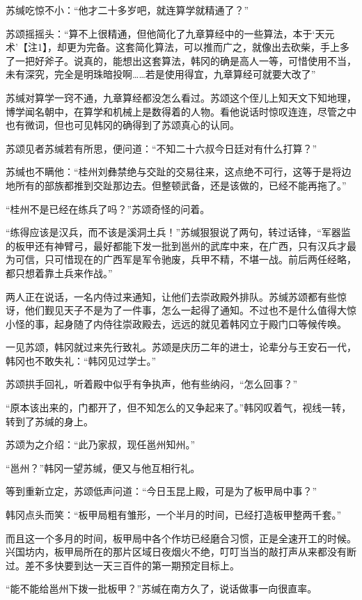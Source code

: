 苏缄吃惊不小：“他才二十多岁吧，就连算学就精通了？”

苏颂摇摇头：“算不上很精通，但他简化了九章算经中的一些算法，本于‘天元术’【注1】，却更为完备。这套简化算法，可以推而广之，就像出去砍柴，手上多了一把好斧子。说真的，能想出这套算法，韩冈的确是高人一等，可惜使用不当，未有深究，完全是明珠暗投啊……若是使用得宜，九章算经可就要大改了”

苏缄对算学一窍不通，九章算经都没怎么看过。苏颂这个侄儿上知天文下知地理，博学闻名朝中，在算学和机械上是数得着的人物。看他说话时惊叹连连，尽管之中也有微词，但也可见韩冈的确得到了苏颂真心的认同。

苏颂见者苏缄若有所思，便问道：“不知二十六叔今日廷对有什么打算？”

苏缄也不瞒他：“桂州刘彝禁绝与交趾的交易往来，这点绝不可行，这等于是将边地所有的部族都推到交趾那边去。但整顿武备，还是该做的，已经不能再拖了。”

“桂州不是已经在练兵了吗？”苏颂奇怪的问着。

“练得应该是汉兵，而不该是溪洞土兵！”苏缄狠狠说了两句，转过话锋，“军器监的板甲还有神臂弓，最好都能下发一批到邕州的武库中来，在广西，只有汉兵才最为可信，只可惜现在的广西军是军令驰废，兵甲不精，不堪一战。前后两任经略，都只想着靠土兵来作战。”

两人正在说话，一名内侍过来通知，让他们去崇政殿外排队。苏缄苏颂都有些惊讶，他们觐见天子不是为了一件事，怎么一起得了通知。不过也不是什么值得大惊小怪的事，起身随了内侍往崇政殿去，远远的就见着韩冈立于殿门口等候传唤。

一见苏颂，韩冈就过来先行致礼。苏颂是庆历二年的进士，论辈分与王安石一代，韩冈也不敢失礼：“韩冈见过学士。”

苏颂拱手回礼，听着殿中似乎有争执声，他有些纳闷，“怎么回事？”

“原本该出来的，门都开了，但不知怎么的又争起来了。”韩冈叹着气，视线一转，转到了苏缄的身上。

苏颂为之介绍：“此乃家叔，现任邕州知州。”

“邕州？”韩冈一望苏缄，便又与他互相行礼。

等到重新立定，苏颂低声问道：“今日玉昆上殿，可是为了板甲局中事？”

韩冈点头而笑：“板甲局粗有雏形，一个半月的时间，已经打造板甲整两千套。”

而且这一个多月的时间，板甲局中各个作坊已经磨合习惯，正是全速开工的时候。兴国坊内，板甲局所在的那片区域日夜烟火不绝，叮叮当当的敲打声从来都没有断过。差不多快要到达一天三百件的第一期预定目标上。

“能不能给邕州下拨一批板甲？”苏缄在南方久了，说话做事一向很直率。

